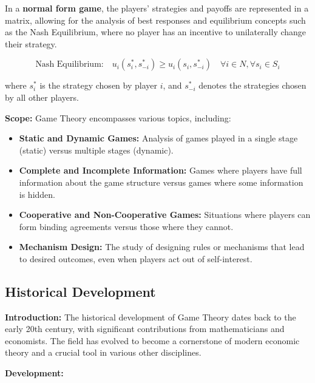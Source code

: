 \documentclass[12pt]{book} %
\begin{document}
In a \textbf{normal form game}, the players' strategies and payoffs are represented in a matrix, allowing for the analysis of best responses and equilibrium concepts such as the Nash Equilibrium, where no player has an incentive to unilaterally change their strategy.

\[
\text{Nash Equilibrium:} \quad u_i(s_i^*, s_{-i}^*) \geq u_i(s_i, s_{-i}^*) \quad \forall i \in N, \forall s_i \in S_i
\]

where \( s_i^* \) is the strategy chosen by player \( i \), and \( s_{-i}^* \) denotes the strategies chosen by all other players.

\textbf{Scope:} Game Theory encompasses various topics, including:

\begin{itemize}
    \item \textbf{Static and Dynamic Games:} Analysis of games played in a single stage (static) versus multiple stages (dynamic).
    \item \textbf{Complete and Incomplete Information:} Games where players have full information about the game structure versus games where some information is hidden.
    \item \textbf{Cooperative and Non-Cooperative Games:} Situations where players can form binding agreements versus those where they cannot.
    \item \textbf{Mechanism Design:} The study of designing rules or mechanisms that lead to desired outcomes, even when players act out of self-interest.
\end{itemize}

\subsection{Historical Development}

\textbf{Introduction:} The historical development of Game Theory dates back to the early 20th century, with significant contributions from mathematicians and economists. The field has evolved to become a cornerstone of modern economic theory and a crucial tool in various other disciplines.

\textbf{Development:}
\end{document}
